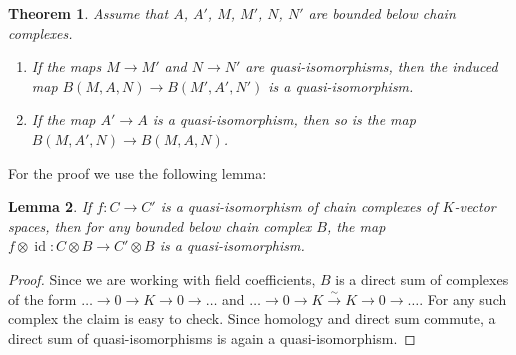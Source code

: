 \documentclass{scrartcl}
\theoremstyle{plain}
\newtheorem{theorem}{Theorem}[section]
\newtheorem{lemma}[theorem]{Lemma}
\theoremstyle{definition}
\let\xto\xrightarrow
\DeclareMathOperator{\id}{id}
\begin{document}
\begin{theorem} \label{thm:bar-quiso} Assume that $A$, $A'$, $M$, $M'$, $N$, $N'$ are bounded below chain complexes.
    \begin{enumerate}
    \item If the maps $M\to M'$ and $N\to N'$ are quasi-isomorphisms, then the induced map $B(M, A, N)\to B(M', A', N')$ is a quasi-isomorphism.
    \item If the map $A'\to A$ is a quasi-isomorphism, then so is the map $B(M, A', N)\to B(M, A, N)$. 
    \end{enumerate}
\end{theorem}
For the proof we use the following lemma:
\begin{lemma} If $f\colon C\to C'$ is a quasi-isomorphism of chain complexes of $K$-vector spaces, then for any bounded below chain complex $B$, the map $f\otimes \id\colon C\otimes B\to C'\otimes B$ is a quasi-isomorphism. 
\end{lemma}
\begin{proof}
    Since we are working with field coefficients, $B$ is a direct sum of complexes of the form $\dots\to0\to K\to 0\to\dots$ and $\dots\to 0\to K\xto{\sim} K\to 0\to\dots$. For any such complex the claim is easy to check. Since homology and direct sum commute, a direct sum of quasi-isomorphisms is again a quasi-isomorphism.
\end{proof}
\end{document}
